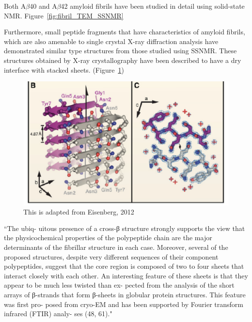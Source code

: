 
Both A$\beta$40 and A$\beta$42 amyloid fibrils have been studied in detail using solid-state NMR. Figure~\ref{fig:fibril_TEM_SSNMR}

Furthermore, small peptide fragments that have characteristics of amyloid fibrils, which are also amenable to single crystal X-ray diffraction analysis have demonstrated similar type structures from those studied using SSNMR.  These structures obtained by X-ray crystallography have been described to have a dry interface with stacked sheets. (Figure~\ref{fig:fibril_xray_model})

\begin{figure}
  \centering
  \includegraphics[width=6in]{figures/introduction/fibril_xray_model.pdf}
  \caption[Characteristic cross-$\beta$ spacings from X-ray fibre diffraction studies of amyloid fibrils]{This is adapted from Eisenberg, 2012}
  \label{fig:fibril_xray_model}
\end{figure}


``The ubiq- uitous presence of a cross-β structure strongly supports the view that the physicochemical properties of the polypeptide chain are the major determinants of the fibrillar structure in each case. Moreover, several of the proposed structures, despite very different sequences of their component polypeptides, suggest that the core region is composed of two to four sheets that interact closely with each other. An interesting feature of these sheets is that they appear to be much less twisted than ex- pected from the analysis of the short arrays of β-strands that form β-sheets in globular protein structures. This feature was first pro- posed from cryo-EM and has been supported by Fourier transform infrared (FTIR) analy- ses (48, 61)."

